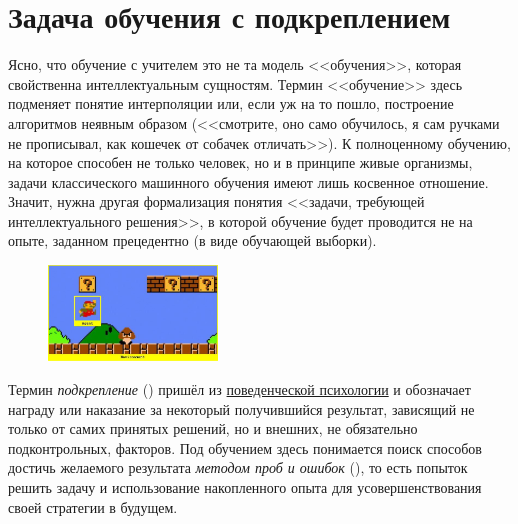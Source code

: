 \chapter{Задача обучения с подкреплением}

Ясно, что обучение с учителем это не та модель <<обучения>>, которая свойственна интеллектуальным сущностям. Термин <<обучение>> здесь подменяет понятие интерполяции или, если уж на то пошло, построение алгоритмов неявным образом (<<смотрите, оно само обучилось, я сам ручками не прописывал, как кошечек от собачек отличать>>). К полноценному обучению, на которое способен не только человек, но и в принципе живые организмы, задачи классического машинного обучения имеют лишь косвенное отношение. Значит, нужна другая формализация понятия <<задачи, требующей интеллектуального решения>>, в которой обучение будет проводится не на опыте, заданном прецедентно (в виде обучающей выборки).

\begin{figure}
\centering
\includegraphics[width=0.4\textwidth]{Images/agentenv.jpeg}
\end{figure}

Термин \emph{подкрепление} () пришёл из \href{https://ru.wikipedia.org/wiki/Бихевиоризм}{поведенческой психологии} и обозначает награду или наказание за некоторый получившийся результат, зависящий не только от самих принятых решений, но и внешних, не обязательно подконтрольных, факторов. Под обучением здесь понимается поиск способов достичь желаемого результата \emph{методом проб и ошибок} (), то есть попыток решить задачу и использование накопленного опыта для усовершенствования своей стратегии в будущем.

